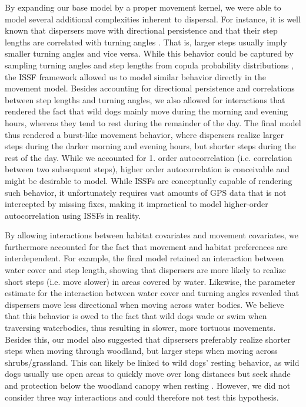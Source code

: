 \documentclass[abstract=on,10pt,a4paper,bibliography=totocnumbered]{article}
\begin{document}
By expanding our base model by a proper movement kernel, we were able to model
several additional complexities inherent to dispersal. For instance, it is well
known that dispersers move with directional persistence and that their step
lengths are correlated with turning angles \citep{Morales.2004, Borger.2012}.
That is, larger steps usually imply smaller turning angles and vice versa. While
this behavior could be captured by sampling turning angles and step lengths from
copula probability distributions \citep{Hodel.2021}, the ISSF framework allowed
us to model similar behavior directly in the movement model. Besides accounting
for directional persistence and correlations between step lengths and turning
angles, we also allowed for interactions that rendered the fact that wild dogs
mainly move during the morning and evening hours, whereas they tend to rest
during the remainder of the day. The final model thus rendered a burst-like
movement behavior, where dispersers realize larger steps during the darker
morning and evening hours, but shorter steps during the rest of the day. While
we accounted for 1. order autocorrelation (i.e. correlation between two
subsequent steps), higher order autocorrelation is conceivable and might be
desirable to model. While ISSFs are conceptually capable of rendering such
behavior, it unfortunately requires vast amounts of GPS data that is not
intercepted by missing fixes, making it impractical to model higher-order
autocorrelation using ISSFs in reality.

By allowing interactions between habitat covariates and movement covariates, we
furthermore accounted for the fact that movement and habitat preferences are
interdependent. For example, the final model retained an interaction between
water cover and step length, showing that dispersers are more likely to realize
short steps (i.e. move slower) in areas covered by water. Likewise, the
parameter estimate for the interaction between water cover and turning angles
revealed that dispersers move less directional when moving across water bodies.
We believe that this behavior is owed to the fact that wild dogs wade or swim
when traversing waterbodies, thus resulting in slower, more tortuous movements.
Besides this, our model also suggested that dipsersers preferably realize
shorter steps when moving through woodland, but larger steps when moving across
shrubs/grassland. This can likely be linked to wild dogs' resting behavior, as
wild dogs usually use open areas to quickly move over long distances
\citep{Abrahms.2017} but seek shade and protection below the woodland canopy
when resting \citep{Creel.2002}. However, we did not consider three way
interactions and could therefore not test this hypothesis.
\end{document}
